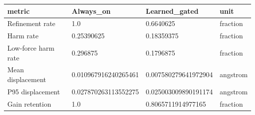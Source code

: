 \begin{tabular}{llll}
\toprule
metric & Always\_on & Learned\_gated & unit \\
\midrule
Refinement rate & 1.0 & 0.6640625 & fraction \\
Harm rate & 0.25390625 & 0.18359375 & fraction \\
Low-force harm rate & 0.296875 & 0.1796875 & fraction \\
Mean displacement & 0.010967916240265461 & 0.007580279641972904 & angstrom \\
P95 displacement & 0.027870263113552275 & 0.025003009890191174 & angstrom \\
Gain retention & 1.0 & 0.8065711914977165 & fraction \\
\bottomrule
\end{tabular}
